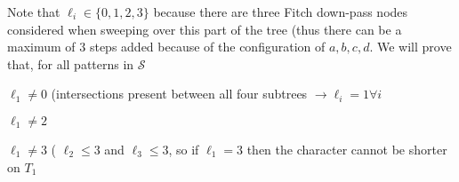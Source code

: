 \documentclass[11pt]{article}
\begin{document}
Note that $\ell_i \in \{0, 1, 2, 3\}$ because there are three Fitch down-pass nodes considered when sweeping over this part of the tree (thus there can be a maximum of 3 steps added because of the configuration of $a,b,c,d$.
We will prove that, for all patterns in $\mathcal{S}$
\begin{compactenum}
	\item  $\ell_1 \neq 0$  (intersections present between all four subtrees $\rightarrow \ell_i = 1 \forall i$
	\item  $\ell_1 \neq 2$
	\item  $\ell_1 \neq 3$ ( $\ell_2 \leq 3$ and $\ell_3 \leq 3$, so if $\ell_1=3$ then the character cannot be shorter on $T_1$
\end{compactenum}


\end{document}
